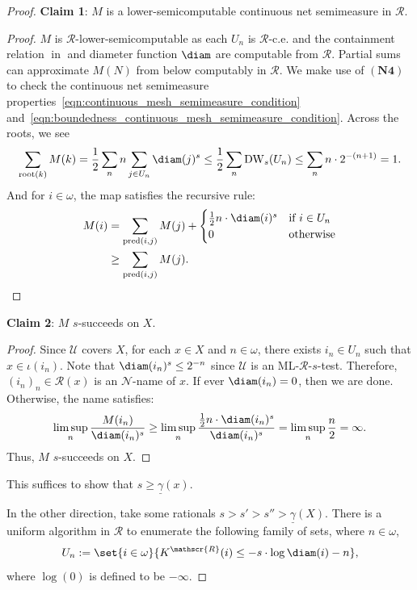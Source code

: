 \begin{proof}
    \noindent \textbf{Claim 1}: $M$ is a lower-semicomputable continuous net semimeasure in $\mathscr{R}$. 
    \begin{proof}
        $M$ is $\mathscr{R}$-lower-semicomputable as each $U_n$ is $\mathscr{R}$-c.e. and the containment relation $\operatorname{in}$ and diameter function $\diam$ are computable from $\mathscr{R}$. Partial sums can approximate $M(N)$ from below computably in $\mathscr{R}$. We make use of $(\mathbf{N4})$ to check the continuous net semimeasure properties~\eqref{eqn:continuous_mesh_semimeasure_condition} and~\eqref{eqn:boundedness_continuous_mesh_semimeasure_condition}. Across the roots, we see
        \begin{align*}
            \sum_{\operatorname{root}(k)} M(k) = \frac{1}{2} \sum_n n \sum_{j \in U_n} \diam(j)^s \leq \frac{1}{2} \sum_n \operatorname{DW}_s(U_n) \leq \sum_n n \cdot 2^{-(n + 1)} = 1.
        \end{align*}
        And for $i \in \omega$, the map satisfies the recursive rule:
        \begin{align*}
            M(i) &= \sum_{\operatorname{pred}(i, j)} M(j) + \begin{cases} \frac{1}{2} n \cdot \diam(i)^s & \text{if } i \in U_n \\ 0 & \text{otherwise} \end{cases}\\
            &\geq \sum_{\operatorname{pred}(i, j)} M(j).
        \end{align*}       
    \end{proof}
    \noindent \textbf{Claim 2}: $M$ $s$-succeeds on $X$.
    \begin{proof}
            Since $\mathcal{U}$ covers $X$, for each $x \in X$ and $n \in \omega$, there exists $i_n \in U_n$ such that $x \in \iota(i_n)$. Note that $\diam(i_n)^{s} \leq 2^{-n}$ since $\mathcal{U}$ is an ML-$\mathscr{R}$-$s$-test. Therefore, $(i_n)_n \in \mathcal{R}(x)$ is an $\mathcal{N}$-name of $x$. If ever $\diam(i_n) = 0$, then we are done. Otherwise, the name satisfies:
        \begin{align*}
            \limsup_n \frac{M(i_n)}{\diam(i_n)^s} \geq \limsup_n \frac{\frac{1}{2}  n \cdot \diam(i_n)^s}{\diam(i_n)^s} = \limsup_n \frac{n}{2}  = \infty.
        \end{align*}
        Thus, $M$ $s$-succeeds on $X$. 
    \end{proof}
    This suffices to show that $s \geq \underline{\gamma}(x)$.

    In the other direction, take some rationals $s > s' > s'' > \underline{\gamma}(X)$. There is a uniform algorithm in $\mathscr{R}$ to enumerate the following family of sets, where $n \in \omega$,
    \begin{align*}
        U_n := \set{i \in \omega}{K^{\mathscr{R}}(i) \leq -s \cdot \log \diam(i) - n},
    \end{align*}
    where $\log(0)$ is defined to be $-\infty$.
    

\end{proof}
